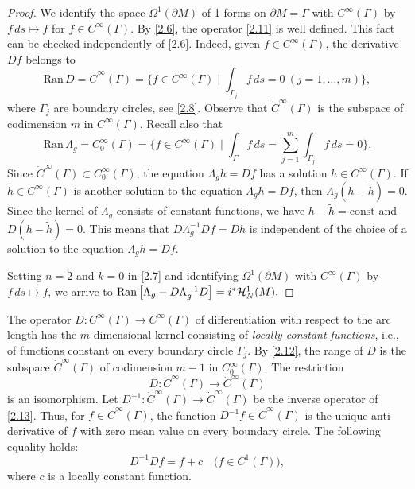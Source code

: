 \documentclass[12pt,reqno]{amsart}
\begin{document}
\begin{proof}
We identify the space $\Omega^1(\partial M)$ of 1-forms on $\partial M=\Gamma$ with $C^\infty(\Gamma)$ by $f\,ds\mapsto f$ for $f\in C^\infty(\Gamma)$. By \eqref{2.6}, the operator \eqref{2.11}
is well defined. This fact can be checked independently of \eqref{2.6}. Indeed, given $f\in C^\infty(\Gamma)$, the derivative $Df$
belongs to
\begin{equation}
\mbox{Ran}\,D=\dot C^\infty(\Gamma)=\Big\{f\in C^\infty(\Gamma)\mid\int_{\Gamma_j} f\,ds=0\ (j=1,\dots,m)\Big\},
                                \label{2.12}
\end{equation}
where $\Gamma_j$ are boundary circles, see \eqref{2.8}. Observe that $\dot C^\infty(\Gamma)$ is the subspace of codimension $m$ in
$C^\infty(\Gamma)$. Recall also that
$$
\mbox{Ran}\,\Lambda_g= C^\infty_0(\Gamma)=\Big\{f\in C^\infty(\Gamma)\mid\int_{\Gamma} f\,ds=\sum\limits_{j=1}^m\int_{\Gamma_j} f\,ds=0\Big\}.
$$
Since $\dot C^\infty(\Gamma)\subset C^\infty_0(\Gamma)$, the equation
$\Lambda_g h=Df$ has a solution $h\in C^\infty(\Gamma)$. If $\widetilde h\in C^\infty(\Gamma)$ is another solution to the equation
$\Lambda_g\widetilde h=Df$, then $\Lambda_g(h-\widetilde h)=0$. Since the kernel of $\Lambda_g$ consists of constant functions, we have $h-\widetilde h=\mbox{const}$ and $D(h-\widetilde h)=0$. This means that
$D\Lambda_g^{-1}Df=Dh$ is independent of the choice of a solution to the equation $\Lambda_g h=Df$.

Setting $n=2$ and $k=0$ in \eqref{2.7} and identifying $\Omega^1(\partial M)$ with $C^\infty(\Gamma)$ by $f\,ds\mapsto f$, we arrive to
$
\mbox{\rm Ran}\left[\Lambda_g-D\Lambda_g^{-1}D\right]
=i^*{\mathcal H}^1_N(M).
$
\end{proof}

The operator
$D:C^\infty(\Gamma)\to C^\infty(\Gamma)$
of differentiation with respect to the arc length has the $m$-dimensional kernel consisting of {\it locally constant functions}, i.e., of functions constant on every boundary circle $\Gamma_j$.
By \eqref{2.12}, the range of $D$ is the subspace $\dot C^\infty(\Gamma)$ of codimension $m-1$ in $C^\infty_0(\Gamma)$.
The restriction
\begin{equation}
D: \dot C^\infty(\Gamma)\to \dot C^\infty(\Gamma)
                                \label{2.13}
\end{equation}
is an isomorphism. Let
$
D^{-1} : \dot C^\infty(\Gamma)\to \dot C^\infty(\Gamma)
$
be the inverse operator of \eqref{2.13}.
Thus, for $f\in \dot C^\infty(\Gamma)$, the function $D^{-1}f\in \dot C^\infty(\Gamma)$ is the unique anti-derivative of $f$ with zero mean value on every boundary circle. The following equality holds:
\begin{equation}
D^{-1}Df=f+c\quad\big(f\in C^1(\Gamma)\big),
                                \label{2.14}
\end{equation}
where $c$ is a locally constant function.
\end{document}
